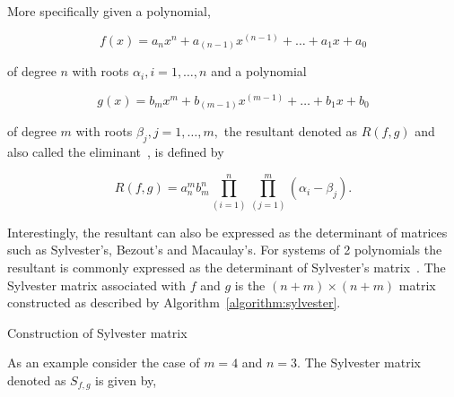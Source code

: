 More specifically given a polynomial,

\[ f(x) = a_n x^n + a_{(n-1)} x ^{(n-1)} + \dots +a_1 x + a_0 \]

of degree \(n\) with roots \(\alpha_i, i=1, \dots, n\) and a polynomial

\[ g(x) = b_m x ^m + b_{(m-1)} x^{(m-1)} + \dots + b_1 x + b_0 \]

of degree \(m\) with roots \(\beta_j, j=1, \dots , m,\) the resultant denoted as \(R(f, g)\)
and also called the eliminant~\cite{Salmon1924}, is defined by

\begin{equation}\label{eq:resultant_definition}
R(f, g) = a_n^m b_m^n \prod_{(i=1)}^n \prod_{(j=1)}^m ( \alpha_i - \beta_j).
\end{equation}

Interestingly, the resultant can also be expressed as the determinant of
matrices such as Sylvester's, Bezout's and Macaulay's. For systems
of 2 polynomials the resultant is commonly expressed as the determinant of 
Sylvester's matrix~\cite{Akritas2014}. The Sylvester matrix associated with
\(f\) and \(g\) is the \((n + m) \times (n + m)\) matrix constructed as
described by Algorithm~\ref{algorithm:sylvester}.

\begin{algorithm}[H]
\caption{Construction of Sylvester matrix~\cite{Akritas2014}}\label{algorithm:sylvester}
\end{algorithm}

As an example consider the case of \(m = 4\) and \(n = 3\). The Sylvester matrix
denoted as \(S_{f,g}\) is given by,

